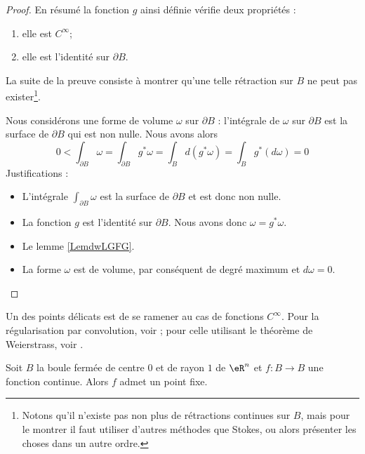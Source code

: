 \begin{proof}
    En résumé la fonction \( g\) ainsi définie vérifie deux propriétés :
    \begin{enumerate}
        \item
            elle est \(  C^{\infty}\);
        \item
            elle est l'identité sur \( \partial B\).
    \end{enumerate}
    La suite de la preuve consiste à montrer qu'une telle rétraction sur \( B\) ne peut pas exister\footnote{Notons qu'il n'existe pas non plus de rétractions continues sur \( B\), mais pour le montrer il faut utiliser d'autres méthodes que Stokes, ou alors présenter les choses dans un autre ordre.}.

    Nous considérons une forme de volume \( \omega\) sur \( \partial B\) : l'intégrale de \( \omega\) sur \( \partial B\) est la surface de \( \partial B\) qui est non nulle. Nous avons alors
    \begin{equation}
        0<\int_{\partial B}\omega
        =\int_{\partial B}g^*\omega
        =\int_Bd(g^*\omega)
        =\int_Bg^*(d\omega)
        =0
    \end{equation}
    Justifications :
    \begin{itemize}
        \item 
            L'intégrale \( \int_{\partial B}\omega\) est la surface de \( \partial B\) et est donc non nulle.
        \item
            La fonction \( g\) est l'identité sur \( \partial B\). Nous avons donc \( \omega=g^*\omega\).
        \item
            Le lemme \ref{LemdwLGFG}.
        \item
            La forme \( \omega\) est de volume, par conséquent de degré maximum et \( d\omega=0\).
    \end{itemize}
\end{proof}

Un des points délicats est de se ramener au cas de fonctions \( C^{\infty}\). Pour la régularisation par convolution, voir \cite{AllardBrouwer}; pour celle utilisant le théorème de Weierstrass, voir \cite{KuttlerTopInAl}.
\begin{theorem}\label{ThoRGjGdO}
    Soit \( B\) la boule fermée de centre \( 0\) et de rayon \( 1\) de \( \eR^n\) et \( f\colon B\to B\) une fonction continue. Alors \( f\) admet un point fixe.
\end{theorem}

